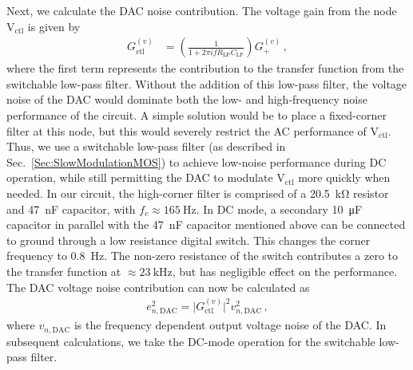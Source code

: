\documentclass[aip,rsi,reprint]{revtex4-1} %
\begin{document}
Next, we calculate the DAC noise contribution.
The voltage gain from the node $\text{V}_{\text{ctl}}$ is given by
\begin{align}
\label{Eq:Gdc}
G^{(v)}_{\text{ctl}} &= \left(\frac{1}{1+2\pi i f R_\text{LP} C_\text{LP}}\right)G_{+}^{(v)}\,,
\end{align}
where the first term represents the contribution to the transfer function from the switchable low-pass filter.
Without the addition of this low-pass filter, the voltage noise of the DAC would dominate both the low- and high-frequency noise performance of the circuit.
A simple solution would be to place a fixed-corner filter at this node, but this would severely restrict the AC performance of $\text{V}_\text{ctl}$.
Thus, we use a switchable low-pass filter (as described in Sec.~\ref{Sec:SlowModulationMOS}) to achieve low-noise performance during DC operation, while still permitting the DAC to modulate $\text{V}_\text{ctl}$ more quickly when needed.
In our circuit, the high-corner filter is comprised of a \SI{20.5}{\kilo\ohm} resistor and \SI{47}{\nano\farad} capacitor, with $f_c \approx \SI{165}{\hertz}$.
In DC mode, a secondary \SI{10}{\micro\farad} capacitor in parallel with the \SI{47}{\nano\farad} capacitor mentioned above can be connected to ground through a low resistance digital switch.
This changes the corner frequency to \SI{0.8}{\hertz}.
The non-zero resistance of the switch contributes a zero to the transfer function at $\approx\SI{23}{\kilo\hertz}$, but has negligible effect on the performance.
The DAC voltage noise contribution can now be calculated as 
\begin{align}
e^2_{n,\text{DAC}} = \big|G^{(v)}_{\text{ctl}}\big|^2 v^2_{n,\text{DAC}}\,,
\end{align}
where $v_{n,\text{DAC}}$ is the frequency dependent output voltage noise of the DAC\cite{AD56XXRDatasheet}. 
In subsequent calculations, we take the DC-mode operation for the switchable low-pass filter.

 
\end{document}
